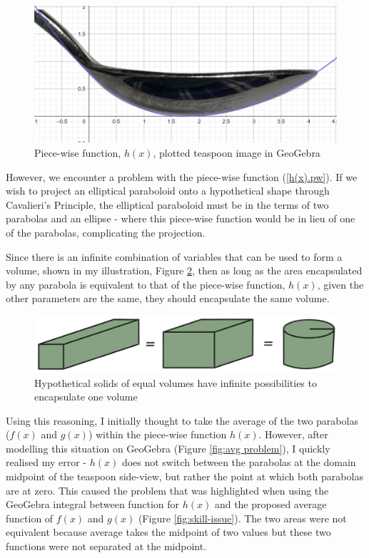 \documentclass[12pt]{article}
\begin{document}
\begin{figure}[h]
    \centering
        \includegraphics[scale=0.45]{images/modelled tsp.png}
        \caption{Piece-wise function, $h(x)$, plotted teaspoon image in GeoGebra}
    \label{fig:tsp model}
\end{figure}

However, we encounter a problem with the piece-wise function (\ref{h(x).pw}). If we wish to project an elliptical paraboloid onto a hypothetical shape through Cavalieri's Principle, the elliptical paraboloid must be in the terms of two parabolas and an ellipse - where this piece-wise function would be in lieu of one of the parabolas, complicating the projection.

Since there is an infinite combination of variables that can be used to form a volume, shown in my illustration, Figure \ref{fig:inf volumes}, then as long as the area encapsulated by any parabola is equivalent to that of the piece-wise function, $h(x)$, given the other parameters are the same, they should encapsulate the same volume. 

\begin{figure}[h]
    \centering
        \includegraphics[scale=0.15]{images/volumes equiv.jpg}
        \caption{Hypothetical solids of equal volumes have infinite possibilities to encapsulate one volume}
    \label{fig:inf volumes}
\end{figure}

Using this reasoning, I initially thought to take the average of the two parabolas ($f(x)$ and $g(x)$) within the piece-wise function $h(x)$. However, after modelling this situation on GeoGebra (Figure \ref{fig:avg problem}), I quickly realised my error - $h(x)$ does not switch between the parabolas at the domain midpoint of the teaspoon side-view, but rather the point at which both parabolas are at zero. This caused the problem that was highlighted when using the GeoGebra integral between function for $h(x)$ and the proposed average function of $f(x)$ and $g(x)$ (Figure \ref{fig:skill-issue}). The two areas were not equivalent because average takes the midpoint of two values but these two functions were not separated at the midpoint. 
\end{document}

